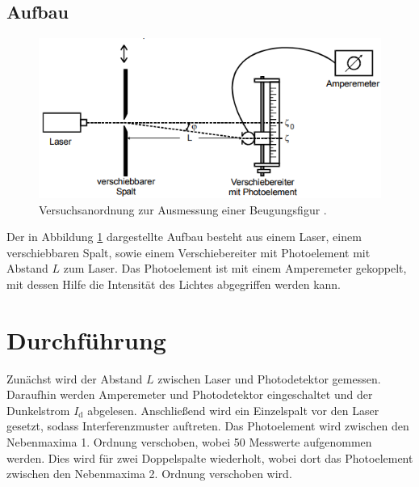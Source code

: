 
\subsection{Aufbau}
\label{sec:Aufbau}

\begin{figure}[H]
\centering
\includegraphics[width=\linewidth-30pt,height=\textheight-30pt,keepaspectratio]{Text/Bilder/Aufbau.png}
\caption{Versuchsanordnung zur Ausmessung einer Beugungsfigur \cite[36]{sample}.}
\label{fig:aufbau}
\end{figure}

Der in Abbildung \ref{fig:aufbau} dargestellte Aufbau besteht aus einem Laser, einem verschiebbaren Spalt, sowie einem Verschiebereiter mit Photoelement mit Abstand $L$ zum Laser.
Das Photoelement ist mit einem Amperemeter gekoppelt, mit dessen Hilfe die Intensität des Lichtes abgegriffen werden kann.
\section{Durchführung}
\label{sec:Durchführung}
Zunächst wird der Abstand $L$ zwischen Laser und Photodetektor gemessen.  Daraufhin werden Amperemeter und Photodetektor eingeschaltet und der
Dunkelstrom $I_\text{d}$ abgelesen. Anschließend wird ein Einzelspalt vor den Laser gesetzt, sodass Interferenzmuster auftreten.
Das Photoelement wird zwischen den Nebenmaxima 1. Ordnung verschoben, wobei 50 Messwerte aufgenommen werden.
Dies wird für zwei Doppelspalte wiederholt, wobei dort das Photoelement zwischen den Nebenmaxima 2. Ordnung verschoben wird.
